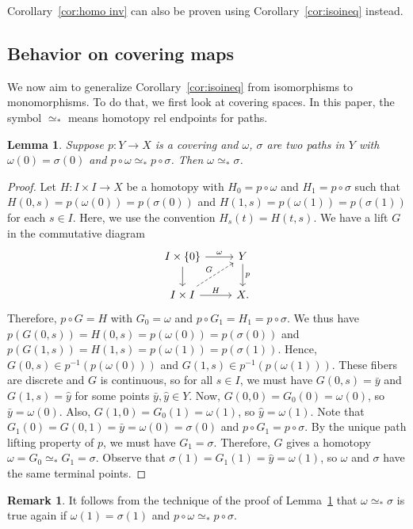 \documentclass[amscd,amssymb,verbatim,11pt]{amsart}
\theoremstyle{plain}
\newtheorem{lemma}[thm]{Lemma}
\theoremstyle{definition}
\newtheorem{remark}[thm]{Remark}
\begin{document}
Corollary~\ref{cor:homo inv} can also be proven using Corollary~\ref{cor:isoineq} instead.

\subsection{Behavior on covering maps}\label{subsec: behavior covering}
We now aim to generalize Corollary~\ref{cor:isoineq} from isomorphisms to monomorphisms. To do that, we first look at covering spaces. In this paper, the symbol $\simeq_*$ means homotopy rel endpoints for paths.


\begin{lemma}\label{lem:lifthomo}
Suppose $p \colon Y \to X$ is a covering and $\omega$, $\sigma$ are two paths in $Y$ with $\omega(0)
= \sigma(0)$ and $p\circ \omega \simeq_* p \circ \sigma$. Then $\omega \simeq_* \sigma$.
\end{lemma}
\begin{proof}
Let $H\colon I \times I\to X$ be a homotopy with $H_0=p\circ \omega$ and $H_1 = p\circ \sigma$ such that
$H(0,s)= p(\omega(0)) = p(\sigma(0))$ and $H(1,s) = p(\omega(1)) = p(\sigma(1))$ for each $s\in I$. Here, we use the convention $H_s(t)=H(t,s)$. We have a lift
$G$ in the commutative diagram
\[
\begin{tikzcd}[contains/.style = {draw=none,"\in" description,sloped}]
I \times \{0\} \arrow{r}{\omega} \arrow[swap]{d}
&
Y \arrow{d}{p}
\\
I\times I  \arrow{r}{H} \arrow[ur, dashed, "G"]
&
X.
\end{tikzcd}
\]
Therefore, $p\circ G=H$ with $G_0=\omega$ and $p\circ G_1=H_1=p\circ \sigma$. We thus have $p(G(0,s))=H(0,s)=p(\omega(0))
=p(\sigma(0))$ and $p(G(1,s))=H(1,s)=p(\omega(1))=p(\sigma(1))$. Hence, $G(0,s) \in p^{-1}(p(\omega(0)))$
and $G(1,s) \in p^{-1}(p(\omega(1)))$. These fibers are discrete and $G$ is continuous, so for all $s\in I$, we must have
$G(0,s)=\bar y$ and $G(1,s)=\widehat y$ for some points $\bar y,\widehat y\in Y$. Now, $G(0,0)=G_0(0)=\omega(0)$, so $\bar y=\omega(0)$. Also, $G(1,0)=G_0(1)=\omega(1)$, so $\widehat y=\omega (1)$. Note that $G_1(0)=G(0,1)=\bar y=\omega(0)=\sigma(0)$ and $p\circ G_1=p\circ \sigma$. By the unique path lifting property of $p$, we must have $G_1 = \sigma$. Therefore, $G$ gives
a homotopy $\omega =G_0\simeq_* G_1 = \sigma$. Observe that $\sigma(1)=G_1(1)=\widehat y=\omega(1)$, so $\omega$ and $\sigma$ have the same terminal points.
\end{proof}

\begin{remark}\label{rem:lifthomo2}
    It follows from the technique of the proof of Lemma~\ref{lem:lifthomo} that $\omega\simeq_{*}\sigma$ is true again if $\omega(1)=\sigma(1)$ and $p\circ \omega\simeq_{*}p\circ\sigma$.
\end{remark}
\end{document}
